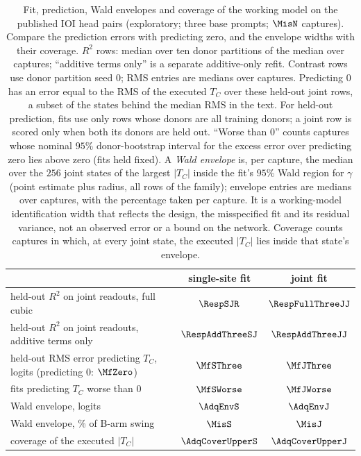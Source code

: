 \begin{table}[t]
\centering\small
\caption{Fit, prediction, Wald envelopes and coverage of the working model on the published IOI head pairs
(exploratory; three base prompts; $\MisN$ captures). Compare the prediction errors with predicting zero, and the envelope widths with their coverage. $R^2$ rows: median over ten donor partitions of the median over captures; ``additive terms only'' is a
separate additive-only refit. Contrast rows use donor partition seed $0$; RMS entries are medians over captures. Predicting $0$ has an error
equal to the RMS of the executed $T_C$ over these held-out joint rows, a subset of the states behind the median RMS
in the text.
For held-out prediction, fits use only rows whose donors are all training donors; a joint row is scored only when both its donors are held out.
``Worse than $0$'' counts captures whose nominal $95\%$ donor-bootstrap interval for the excess error over predicting
zero lies above zero (fits held fixed). A \emph{Wald envelope} is, per capture, the median over the $256$ joint states
of the largest $|T_C|$ inside the fit's $95\%$ Wald region for $\gamma$ (point estimate plus radius, all rows of the
family); envelope entries are medians over captures, with the percentage taken per capture. It is a working-model
identification width that reflects the design, the misspecified fit and its residual variance, not an observed error
or a bound on the network. Coverage counts captures in which, at every joint state, the executed $|T_C|$ lies inside
that state's envelope.}
\label{tab:scales}
\begin{tabular}{lcc}
\toprule
 & single-site fit & joint fit \\
\midrule
held-out $R^2$ on joint readouts, full cubic & $\RespSJR$ & $\RespFullThreeJJ$ \\
held-out $R^2$ on joint readouts, additive terms only & $\RespAddThreeSJ$ & $\RespAddThreeJJ$ \\
held-out RMS error predicting $T_C$, logits (predicting $0$: $\MfZero$) & $\MfSThree$ & $\MfJThree$ \\
fits predicting $T_C$ worse than $0$ & $\MfSWorse$ & $\MfJWorse$ \\
Wald envelope, logits & $\AdqEnvS$ & $\AdqEnvJ$ \\
Wald envelope, \% of B-arm swing & $\MisS$ & $\MisJ$ \\
coverage of the executed $|T_C|$ & $\AdqCoverUpperS$ & $\AdqCoverUpperJ$ \\
\bottomrule
\end{tabular}
\end{table}

